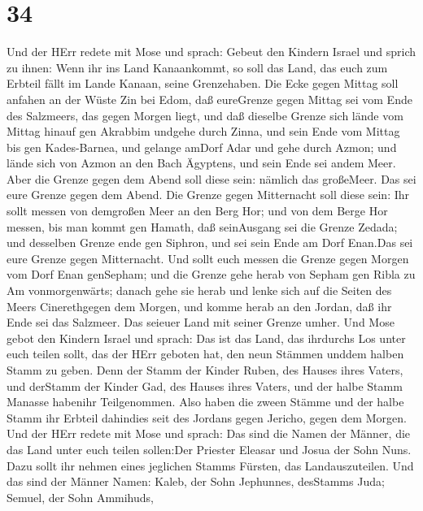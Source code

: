 \hypertarget{section-33}{%
\section{34}\label{section-33}}

 Und der HErr redete mit Mose und sprach: 
Gebeut den Kindern Israel und sprich zu ihnen: Wenn ihr ins Land
Kanaankommt, so soll das Land, das euch zum Erbteil fällt im Lande
Kanaan, seine Grenzehaben.  Die Ecke gegen Mittag soll
anfahen an der Wüste Zin bei Edom, daß eureGrenze gegen Mittag sei vom
Ende des Salzmeers, das gegen Morgen liegt,  und daß
dieselbe Grenze sich lände vom Mittag hinauf gen Akrabbim undgehe durch
Zinna, und sein Ende vom Mittag bis gen Kades-Barnea, und gelange amDorf
Adar und gehe durch Azmon;  und lände sich von Azmon an den
Bach Ägyptens, und sein Ende sei andem Meer.  Aber die
Grenze gegen dem Abend soll diese sein: nämlich das großeMeer. Das sei
eure Grenze gegen dem Abend.  Die Grenze gegen Mitternacht
soll diese sein: Ihr sollt messen von demgroßen Meer an den Berg Hor;
 und von dem Berge Hor messen, bis man kommt gen Hamath, daß
seinAusgang sei die Grenze Zedada;  und desselben Grenze
ende gen Siphron, und sei sein Ende am Dorf Enan.Das sei eure Grenze
gegen Mitternacht.  Und sollt euch messen die Grenze gegen
Morgen vom Dorf Enan genSepham;  und die Grenze gehe herab
von Sepham gen Ribla zu Am vonmorgenwärts; danach gehe sie herab und
lenke sich auf die Seiten des Meers Cinerethgegen dem Morgen,
 und komme herab an den Jordan, daß ihr Ende sei das
Salzmeer. Das seieuer Land mit seiner Grenze umher.  Und
Mose gebot den Kindern Israel und sprach: Das ist das Land, das
ihrdurchs Los unter euch teilen sollt, das der HErr geboten hat, den
neun Stämmen unddem halben Stamm zu geben.  Denn der Stamm
der Kinder Ruben, des Hauses ihres Vaters, und derStamm der Kinder Gad,
des Hauses ihres Vaters, und der halbe Stamm Manasse habenihr
Teilgenommen.  Also haben die zween Stämme und der halbe
Stamm ihr Erbteil dahindies seit des Jordans gegen Jericho, gegen dem
Morgen.  Und der HErr redete mit Mose und sprach:
 Das sind die Namen der Männer, die das Land unter euch
teilen sollen:Der Priester Eleasar und Josua der Sohn Nuns.
 Dazu sollt ihr nehmen eines jeglichen Stamms Fürsten, das
Landauszuteilen.  Und das sind der Männer Namen: Kaleb, der
Sohn Jephunnes, desStamms Juda;  Semuel, der Sohn Ammihuds,
